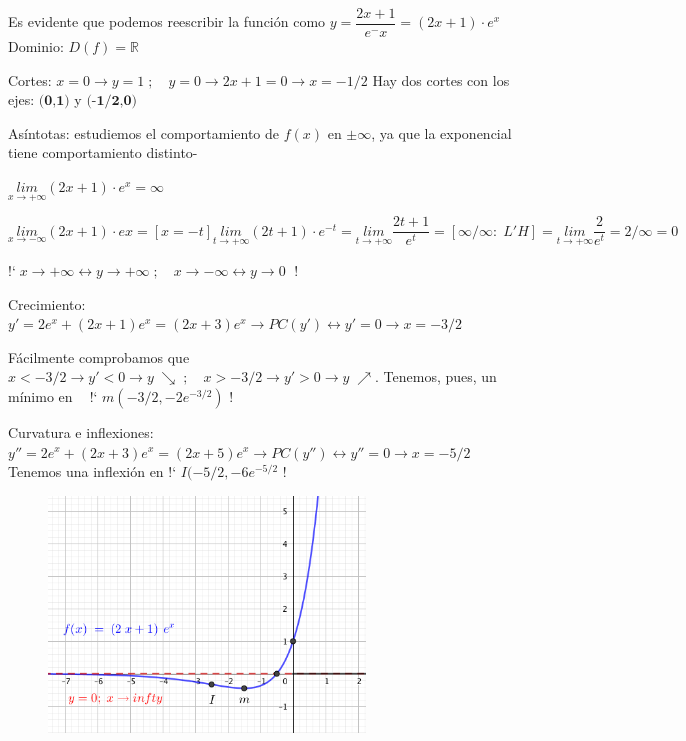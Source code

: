 \begin{proofw}\renewcommand{\qedsymbol}{$\diamond$}	


Es evidente que podemos reescribir la función como $y=\dfrac {2x+1}{e^-x}= (2x+1)\cdot e^x$
Dominio: $D(f)=\mathbb R$

Cortes: $x=0 \to y=1\; ; \quad y=0 \to 2x+1=0 \to x=-1/2$ Hay dos cortes con los ejes: $\textbf{(0,1)}$ y $\textbf{(-1/2,0)}$

Asíntotas: estudiemos el comportamiento de $f(x)$ en $\pm \infty$, ya que la exponencial tiene comportamiento distinto-

$\underset {x\to + \infty}{lim}{(2x+1)\cdot e^x}=\infty $

$\underset {x\to - \infty}{lim}{(2x+1)\cdot ex}= [x=-t]\underset {t\to + \infty}{lim}{(2t+1)\cdot e^{-t}}=\underset {t\to + \infty}{lim}{\dfrac {2t+1}{e^t} }= [\infty / \infty: \; L'H] = \underset {t\to + \infty}{lim}{\dfrac {2}{e^t} } = 2/\infty = 0$

!`$\; x\to +\infty \leftrightarrow y \to +\infty \; ; \quad x\to -\infty \leftrightarrow y \to 0 \; $ !

Crecimiento: $y'=2 e^x + (2x+1)e^x=(2x+3)e^x \to PC(y') \leftrightarrow y'=0 \to x=-3/2$


	
Fácilmente comprobamos que $x<-3/2 \to y'<0 \to y\; \searrow\; ; \quad x>-3/2 \to y'>0 \to y\; \nearrow$. Tenemos, pues, un mínimo en $\; \;$ !` $m(-3/2,-2e^{-3/2})$ !

Curvatura e inflexiones: $y''=2e^x+(2x+3)e^x=(2x+5)e^x \to PC(y'') \leftrightarrow y''=0 \to x=-5/2  $ Tenemos una inflexión en !` $I(-5/2, -6e^{-5/2}$ !

	\begin{figure}[H]
		\centering
		\includegraphics[width=0.75\textwidth]{imagenes/imagenes05/T05IM38.png}
	\end{figure}

	
\end{proofw}

